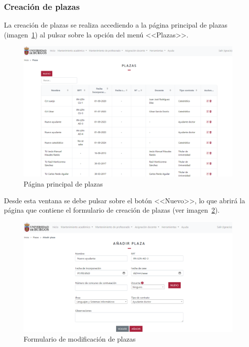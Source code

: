 \subsubsection{Creación de plazas}
La creación de plazas se realiza accediendo a la página principal de plazas (imagen~\ref{pag:plazas}) al pulsar sobre la opción del menú <<Plazas>>.

\begin{figure}
	\centering
	\includegraphics[width=\textwidth]{../img/Anexos/Manual usuario/plazas.png}
	\caption{Página principal de plazas}\label{pag:plazas}
\end{figure}

Desde esta ventana se debe pulsar sobre el botón <<Nuevo>>, lo que abrirá la página que contiene el formulario de creación de plazas (ver imagen~\ref{pag:formPlaza}).

\begin{figure}
	\centering
	\includegraphics[width=\textwidth]{../img/Anexos/Manual usuario/formPlaza.png}
	\caption{Formulario de modificación de plazas}\label{pag:formPlaza}
\end{figure}


